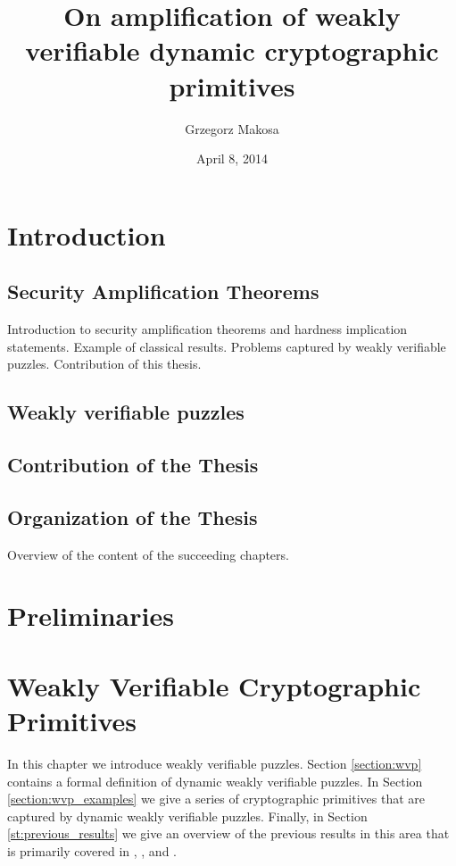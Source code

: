 \documentclass[11pt,a4paper,titlepage]{memoir}
\title{On amplification of weakly verifiable dynamic cryptographic primitives}
\author{Grzegorz Makosa}
\date{April 8, 2014}
\begin{document}
\frontmatter

%

\cleartorecto
\tableofcontents
\mainmatter

\chapter{Introduction}
\section{Security Amplification Theorems}
Introduction to security amplification theorems and hardness implication statements.
Example of classical results. Problems captured by weakly verifiable puzzles.
Contribution of this thesis.
\section{Weakly verifiable puzzles}
\section{Contribution of the Thesis}
\section{Organization of the Thesis}
Overview of the content of the succeeding chapters.

\chapter{Preliminaries}


\chapter{Weakly Verifiable Cryptographic Primitives}
In this chapter we introduce weakly verifiable puzzles.
Section \ref{section:wvp} contains a formal definition of dynamic weakly verifiable puzzles.
In Section \ref{section:wvp_examples} we give a series of cryptographic primitives that are captured by dynamic weakly verifiable puzzles.
Finally, in Section \ref{st:previous_results} we give an overview of the previous results in this area
that is primarily covered in \cite{canetti2004hardness}, \cite{Dodis:2009:SAI:1530441.1530450}, and \cite{DBLP:journals/corr/abs-1002-3534}.
\end{document}
